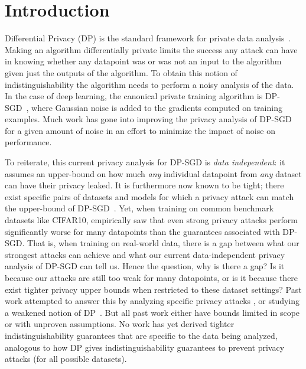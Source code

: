 \section{Introduction}








Differential Privacy (DP) is the standard framework for private data analysis~\citep{dwork2006calibrating}. Making an algorithm differentially private limits the success any attack can have in knowing whether any datapoint was or was not an input to the algorithm given just the outputs of the algorithm. %
To obtain this notion of indistinguishability the algorithm needs to perform a noisy analysis of the data. %
In the case of deep learning, the canonical private training algorithm is DP-SGD~\citep{abadi2016deep}, where Gaussian noise is added to the gradients computed on training examples. Much work has gone into improving the privacy analysis of DP-SGD for a given amount of noise \citep{mironov2017renyi,mironov2019r,gopi2021numerical} in an effort to minimize the impact of noise on performance.



To reiterate, this current privacy analysis for DP-SGD  is \textit{data independent}: it assumes an upper-bound on how much \emph{any} individual datapoint from \textit{any} dataset can have their privacy leaked. It is furthermore now known to be tight; there exist specific pairs of datasets and models for which a privacy attack can match the upper-bound of DP-SGD~\citep{nasr2021adversary}. Yet, when training on common benchmark datasets like CIFAR10, \citet{carlini2022privacy} empirically saw that even strong privacy attacks perform significantly worse for many datapoints than the guarantees associated with DP-SGD. %
That is, when training on real-world data, there is a gap between what our strongest attacks can achieve and what our current data-independent privacy analysis of DP-SGD can tell us. Hence the question, why is there a gap? Is it because our attacks are still too weak for many datapoints, or is it because there exist tighter privacy upper bounds when restricted to these dataset settings? Past work attempted to answer this by analyzing specific privacy attacks \citep{mahloujifar2022optimal, thudi2022bounding, guo2022bounding}, or studying a weakened notion of DP~\citep{yu2022individual}. But all past work either have bounds limited in scope or with unproven assumptions. No work has yet derived tighter indistinguishability guarantees that are specific to the data being analyzed, analogous to how DP gives indistinguishability guarantees to prevent privacy attacks (for all possible datasets).








